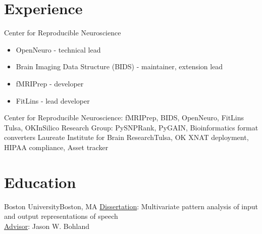 \documentclass[11pt,letterpaper,sans]{moderncv}
\begin{document}
\makecvtitle

\section{Experience}
%
    {Center for Reproducible Neuroscience
\begin{itemize}
  \item OpenNeuro - technical lead
  \item Brain Imaging Data Structure (BIDS) - maintainer, extension lead
  \item fMRIPrep - developer
  \item FitLins - lead developer
\end{itemize}}
%
    {Center for Reproducible Neuroscience: fMRIPrep, BIDS, OpenNeuro, FitLins}
%
    {Tulsa, OK}{}{InSilico Research Group: PySNPRank, PyGAIN, Bioinformatics format converters}
%
    {Laureate Institute for Brain Research}{Tulsa, OK}{}%
    {XNAT deployment, HIPAA compliance, Asset tracker}

\section{Education}
%
    {Boston University}{Boston, MA}{}%
    {\underline{Dissertation}: Multivariate pattern analysis of input and output
     representations of speech\\
     \underline{Advisor}: Jason W. Bohland}
\end{document}
